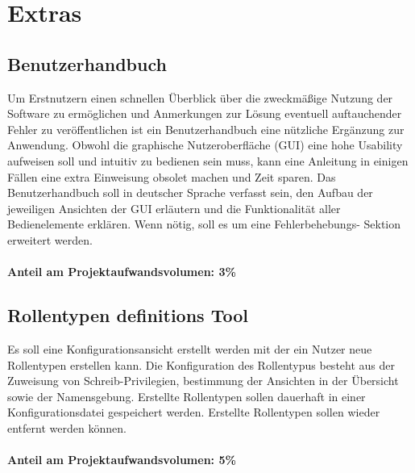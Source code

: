 \section{Extras}
    \subsection{Benutzerhandbuch}

    Um Erstnutzern einen schnellen Überblick über die zweckmäßige Nutzung der
    Software zu ermöglichen und Anmerkungen zur Lösung eventuell auftauchender
    Fehler zu veröffentlichen ist ein Benutzerhandbuch eine nützliche Ergänzung
    zur Anwendung. Obwohl die graphische Nutzeroberfläche (GUI) eine hohe
    Usability aufweisen soll und intuitiv zu bedienen sein muss, kann eine
    Anleitung in einigen Fällen eine extra Einweisung obsolet machen und Zeit
    sparen. Das Benutzerhandbuch soll in deutscher Sprache verfasst sein, den
    Aufbau der jeweiligen Ansichten der GUI erläutern und die Funktionalität
    aller Bedienelemente erklären. Wenn nötig, soll es um eine Fehlerbehebungs-
    Sektion erweitert werden.\\
    \\
    \textbf{Anteil am Projektaufwandsvolumen: 3\%}


    \subsection{Rollentypen definitions Tool}

    Es soll eine Konfigurationsansicht erstellt werden mit der ein Nutzer neue 
    Rollentypen erstellen kann. Die Konfiguration des Rollentypus besteht aus
    der Zuweisung von Schreib-Privilegien, bestimmung der Ansichten in der
    Übersicht sowie der Namensgebung. Erstellte Rollentypen sollen dauerhaft in
    einer Konfigurationsdatei gespeichert werden. Erstellte Rollentypen sollen 
    wieder entfernt werden können.\\
    \\
    \textbf{Anteil am Projektaufwandsvolumen: 5\%}